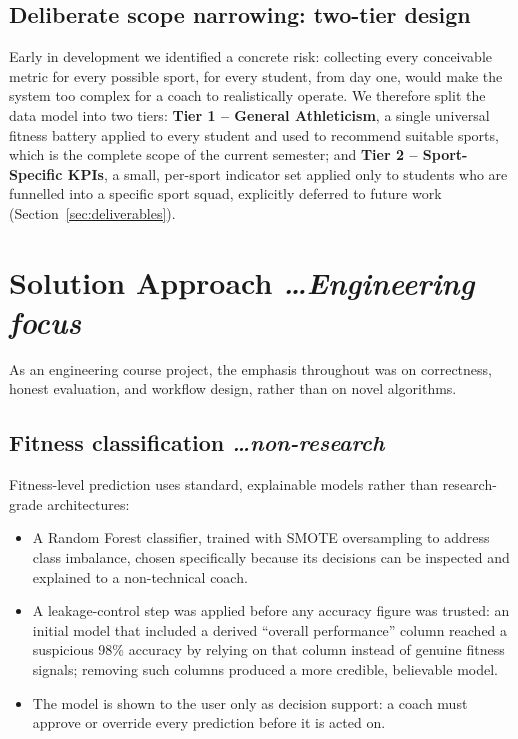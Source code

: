 \documentclass[11pt,a4paper]{article}
\newcommand{\BvrHint}[1]{%
  {\normalfont\normalsize\itshape\hfill #1}}
\begin{document}
\subsection{Deliberate scope narrowing: two-tier design}
Early in development we identified a concrete risk:
collecting every conceivable metric for every possible
sport, for every student, from day one, would make the
system too complex for a coach to realistically operate.
We therefore split the data model into two tiers:
\textbf{Tier 1 -- General Athleticism}, a single universal
fitness battery applied to every student and used to
recommend suitable sports, which is the complete scope of
the current semester; and \textbf{Tier 2 -- Sport-Specific
KPIs}, a small, per-sport indicator set applied only to
students who are funnelled into a specific sport squad,
explicitly deferred to future work (Section~\ref{sec:deliverables}).

\section{Solution Approach %
\BvrHint{\ldots Engineering focus}}
As an engineering course project, the emphasis throughout
was on correctness, honest evaluation, and workflow
design, rather than on novel algorithms.

\subsection{Fitness classification %
\BvrHint{\ldots non-research}}
Fitness-level prediction uses standard, explainable
models rather than research-grade architectures:
\begin{itemize}[leftmargin=0.7cm]
    \item A Random Forest classifier, trained with SMOTE oversampling to address class imbalance, chosen specifically because its decisions can be inspected and explained to a non-technical coach.
    \item A leakage-control step was applied before any accuracy figure was trusted: an initial model that included a derived ``overall performance'' column reached a suspicious 98\% accuracy by relying on that column instead of genuine fitness signals; removing such columns produced a more credible, believable model.
    \item The model is shown to the user only as decision support: a coach must approve or override every prediction before it is acted on.
\end{itemize}
\end{document}
